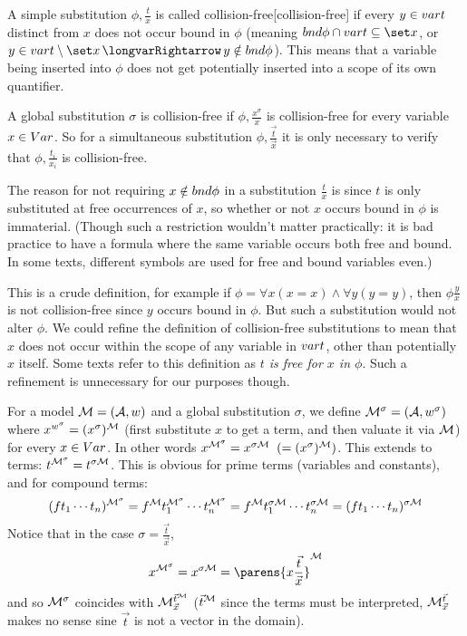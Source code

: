 \bdefn

    A simple substitution $\phi,\frac tx$ is called {\emphcolor collision-free}[collision-free] if every $y\in{\sl var} t$ distinct from $x$ does not occur bound in $\phi$
    (meaning $\bnd\phi\cap\var t\subseteq\set x$, or $y\in\var t\setminus\set x\implies y\notin\bnd\phi$).
    This means that a variable being inserted into $\phi$ does not get potentially inserted into a scope of its own quantifier.

    A global substitution $\sigma$ is collision-free if $\phi,\frac{x^\sigma}x$ is collision-free for every variable $x\in{\sl Var}$.
    So for a simultaneous substitution $\phi,\frac{\vec t}{\vec x}$ it is only necessary to verify that $\phi,\frac{t_i}{x_i}$ is collision-free.

\edefn

The reason for not requiring $x\notin{\sl bnd}\phi$ in a substitution $\frac tx$ is since $t$ is only substituted at free occurrences of $x$, so whether or not $x$ occurs bound in $\phi$ is immaterial.
(Though such a restriction wouldn't matter practically: it is bad practice to have a formula where the same variable occurs both free and bound.
In some texts, different symbols are used for free and bound variables even.)

This is a crude definition, for example if $\phi=\forall x(x=x)\land\forall y(y=y)$, then $\phi\frac yx$ is not collision-free since $y$ occurs bound in $\phi$.
But such a substitution would not alter $\phi$.
We could refine the definition of collision-free substitutions to mean that $x$ does not occur within the scope of any variable in ${\sl var} t$, other than potentially $x$ itself.
Some texts refer to this definition as {\it $t$ is free for $x$ in $\phi$}.
Such a refinement is unnecessary for our purposes though.

For a model ${\cal M}=({\cal A},w)$ and a global substitution $\sigma$, we define ${\cal M}^\sigma=({\cal A},w^\sigma)$ where $x^{w^\sigma}=(x^\sigma)^{\cal M}$ (first substitute $x$ to get a term, and then
valuate it via ${\cal M}$) for every $x\in{\sl Var}$.
In other words $x^{{\cal M}^\sigma} = x^{\sigma{\cal M}}\mathrel{}(=(x^\sigma)^{\cal M})$.
This extends to terms: $t^{{\cal M}^\sigma}=t^{\sigma{\cal M}}$.
This is obvious for prime terms (variables and constants), and for compound terms:
$$ (ft_1\cdots t_n)^{{\cal M}^\sigma} = f^{\cal M}t_1^{\cal M^\sigma}\cdots t_n^{\cal M^\sigma} = f^{\cal M}t_1^{\sigma\cal M}\cdots t_n^{\sigma\cal M} = (ft_1\cdots t_n)^{\sigma\cal M} $$
Notice that in the case $\sigma=\frac{\vec t}{\vec x}$,
$$ x^{\cal M^\sigma} = x^{\sigma\cal M} = \parens{x\frac{\vec t}{\vec x}}^{\cal M} $$
and so ${\cal M}^\sigma$ coincides with ${\cal M}^{\vec t^{\cal M}}_{\vec x}$ ($\vec t^{\cal M}$ since the terms must be interpreted, ${\cal M}^{\vec t}_{\vec x}$ makes no sense sine $\vec t$ is not a
vector in the domain).

